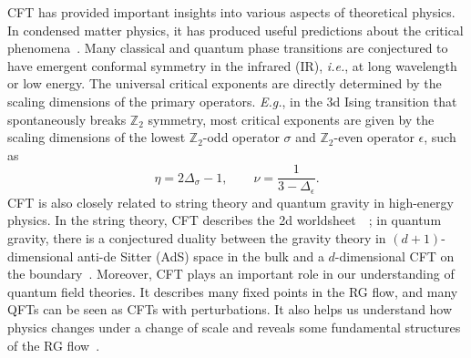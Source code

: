 \documentclass{timesjhep}
\begin{document}
CFT has provided important insights into various aspects of theoretical physics. In condensed matter physics, it has produced useful predictions about the critical phenomena~\cite{Polyakov1970Conformal,Cardy1996Scaling,Sachdev2011Quantum}. Many classical and quantum phase transitions are conjectured to have emergent conformal symmetry in the infrared (IR), \textit{i.e.}, at long wavelength or low energy. The universal critical exponents are directly determined by the scaling dimensions of the primary operators. \textit{E.g.}, in the 3d Ising transition that spontaneously breaks $\mathbb{Z}_2$ symmetry, most critical exponents are given by the scaling dimensions of the lowest $\mathbb{Z}_2$-odd operator $\sigma$ and $\mathbb{Z}_2$-even operator $\epsilon$, such as
\begin{equation}
    \eta=2\Delta_\sigma-1,\qquad\nu=\frac{1}{3-\Delta_\epsilon}.
\end{equation}
CFT is also closely related to string theory and quantum gravity in high-energy physics. In the string theory, CFT describes the 2d worldsheet~\cite{Polchinski1998String}~; in quantum gravity, there is a conjectured duality between the gravity theory in $(d+1)$-dimensional anti-de Sitter (AdS) space in the bulk and a $d$-dimensional CFT on the boundary~\cite{Maldacena1998AdSCFT}. Moreover, CFT plays an important role in our understanding of quantum field theories. It describes many fixed points in the RG flow, and many QFTs can be seen as CFTs with perturbations. It also helps us understand how physics changes under a change of scale and reveals some fundamental structures of the RG flow~\cite{Zamolodchikov1986Irreversibility}.
\end{document}
